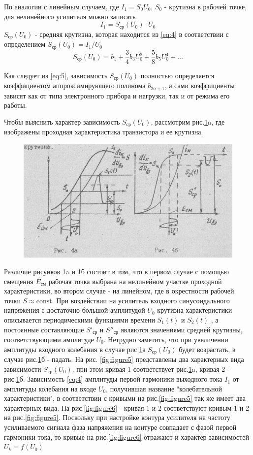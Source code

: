 По аналогии с линейным случаем, где $I_1=S_0U_0$, $S_0$ - крутизна в рабочей точке, для нелинейного усилителя можно записать 
\begin{equation}
I_1=S_\text{ср}(U_0)\cdot U_0
\label{eq:4}
\end{equation}
$S_\text{ср}(U_0)$ - средняя крутизна, которая находится из \eqref{eq:4} в соответствии с определением $S_\text{ср}(U_0)=I_1/U_0$
\begin{equation}
S_\text{ср}(U_0)=b_1+\frac{3}{4}b_3U_0^2+\frac{5}{8}b_5U_0^4+\ldots
\label{eq:5}
\end{equation}

Как следует из \eqref{eq:5}, зависимость $S_\text{ср}(U_0)$ полностью определяется коэффициентом аппроксимирующего полинома $b_{2n+1}$, а сами коэффициенты зависят как от типа электронного прибора и нагрузки, так и от режима его работы.

Чтобы выяснить характер зависимость $S_\text{ср}(U_0)$, рассмотрим рис.\ref{fig:figure4}a, где изображены проходная характеристика транзистора и ее крутизна.
\begin{figure}[h]
	\centering
	\includegraphics[width=0.4\linewidth]{circuit/4.jpg}
	\caption{}
	\label{fig:figure4}
\end{figure}
Различие рисунков \ref{fig:figure4}a и \ref{fig:figure4}б состоит в том, что в первом случае с помощью смещения $E_\text{см}$ рабочая точка выбрана на нелинейном участке проходной характеристики, во втором случае - на линейном, где в окрестности рабочей точки $S\approx\text{const}$. При воздействии на усилитель входного синусоидального напряжения с достаточно большой амплитудой $U_0$ крутизна характеристики описывается периодическими функциями времени $S_1(t)$ и $S_2(t)$ , а постоянные составляющие $S'_\text{ср}$ и $S''_\text{ср}$ являются значениями средней крутизны, соответствующими амплитуде $U_0$. Нетрудно заметить, что при увеличении амплитуды входного колебания в случае рис.\ref{fig:figure4}а $S_\text{ср}(U_0)$ будет возрастать, в случае рис.\ref{fig:figure4}б - падать. На рис. \ref{fig:figure5} представлены два характерных вида зависимости $S_\text{ср}(U_0)$, при этом кривая 1 соответствует рис.\ref{fig:figure4}a, кривая 2 - рис.\ref{fig:figure4}б.
Зависимость \eqref{eq:4} амплитуды первой гармоники выходного тока $I_1$ от амплитуды колебания на входе $U_0$, получившая название "колебательной характеристики", в соответствии с кривыми на рис.\ref{fig:figure5} так же имеет два характерных вида. На рис.\ref{fig:figure6} - кривая 1 и 2 соответствуют кривым 1 и 2 на рис.\ref{fig:figure5}. Поскольку при настройке контура усилителя на частоту усиливаемого сигнала фаза напряжения на контуре совпадает с фазой первой гармоники тока, то кривые на рис.\ref{fig:figure6} отражают и характер зависимостей $U_k=f(U_0)$

